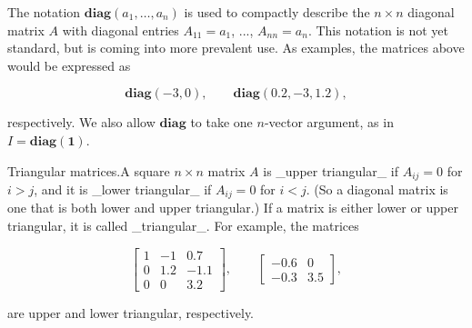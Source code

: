 The notation \(\mathbf{diag}(a_{1},\ldots,a_{n})\) is used to compactly describe the \(n\times n\) diagonal matrix \(A\) with diagonal entries \(A_{11}=a_{1}\), ..., \(A_{nn}=a_{n}\). This notation is not yet standard, but is coming into more prevalent use. As examples, the matrices above would be expressed as

\[\mathbf{diag}(-3,0),\qquad\mathbf{diag}(0.2,-3,1.2),\]

respectively. We also allow \(\mathbf{diag}\) to take one \(n\)-vector argument, as in \(I=\mathbf{diag}(\mathbf{1})\).

Triangular matrices.A square \(n\times n\) matrix \(A\) is _upper triangular_ if \(A_{ij}=0\) for \(i>j\), and it is _lower triangular_ if \(A_{ij}=0\) for \(i<j\). (So a diagonal matrix is one that is both lower and upper triangular.) If a matrix is either lower or upper triangular, it is called _triangular_. For example, the matrices

\[\left[\begin{array}{rrr}1&-1&0.7\\ 0&1.2&-1.1\\ 0&0&3.2\end{array}\right],\qquad\left[\begin{array}{rrr}-0.6&0\\ -0.3&3.5\end{array}\right],\]

are upper and lower triangular, respectively.

 